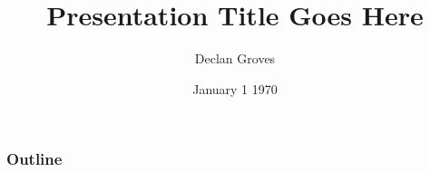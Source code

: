 \documentclass[t]{beamer}
\title{Presentation Title Goes Here}
\author{Declan Groves}
\date{January 1 1970}
\begin{document}
\begin{frame}
\titlepage
\end{frame}

\begin{frame}
\frametitle{Outline}
\tableofcontents
\end{frame}


\end{document}
